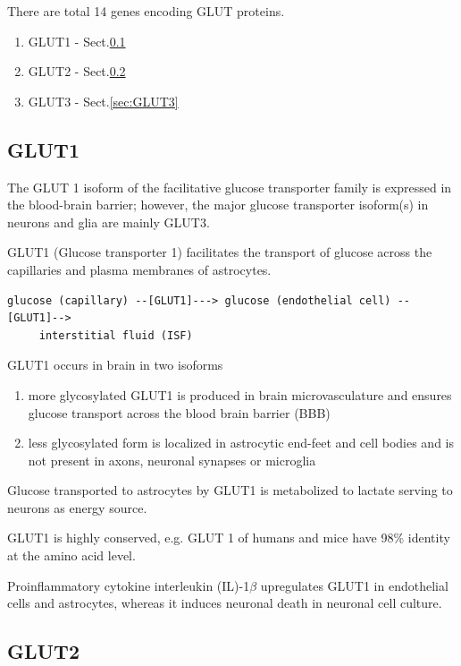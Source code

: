There are total 14 genes encoding GLUT proteins.
\begin{enumerate}
  \item GLUT1 - Sect.\ref{sec:GLUT1}
  \item GLUT2 - Sect.\ref{sec:GLUT2}
  \item GLUT3 - Sect.\ref{sec:GLUT3}
\end{enumerate}

\subsection{GLUT1}
\label{sec:GLUT1}

The GLUT 1 isoform of the facilitative glucose transporter family is expressed
in the blood-brain barrier; however, the major glucose transporter isoform(s) in
neurons and glia are mainly GLUT3. 

GLUT1 (Glucose transporter 1) facilitates the transport of glucose across the
capillaries and plasma membranes of astrocytes.

{\tiny
\begin{verbatim}
glucose (capillary) --[GLUT1]---> glucose (endothelial cell) --[GLUT1]--> 
     interstitial fluid (ISF)
\end{verbatim}
}

GLUT1 occurs in brain in two isoforms
\begin{enumerate}
  \item  more glycosylated GLUT1 is produced in brain microvasculature and
  ensures glucose transport across the blood brain barrier (BBB)
  
  \item less glycosylated form is localized in astrocytic end-feet and cell
  bodies and is not present in axons, neuronal synapses or microglia
\end{enumerate}
Glucose transported to astrocytes by GLUT1 is metabolized to lactate serving to
neurons as energy source. 

GLUT1 is highly conserved, e.g. GLUT 1 of humans and mice have 98\% identity at
the amino acid level. 

Proinflammatory cytokine interleukin (IL)-1$\beta$ upregulates GLUT1 in
endothelial cells and astrocytes,  whereas it induces neuronal death in neuronal
cell culture.

\subsection{GLUT2}
\label{sec:GLUT2}


